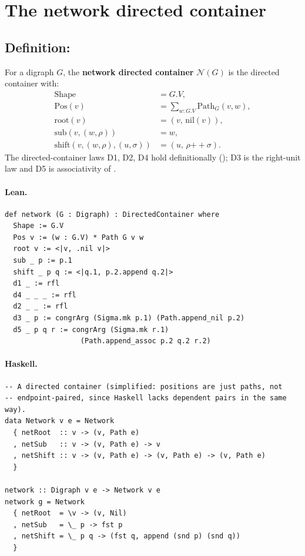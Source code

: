 \documentclass[11pt,a4paper]{article}
\begin{document}
\section{The network directed container}

\subsection{Definition: }

\begin{defn}
For a digraph $G$, the \textbf{network directed container} $\mathcal{N}(G)$ is
the directed container with:
\begin{align*}
  \mathrm{Shape}   &= G.V, \\
  \mathrm{Pos}(v)  &= \textstyle\sum_{w : G.V} \mathrm{Path}_G(v, w), \\
  \mathrm{root}(v) &= (v,\, \mathrm{nil}(v)), \\
  \mathrm{sub}(v, (w, \rho)) &= w, \\
  \mathrm{shift}(v, (w, \rho), (u, \sigma)) &= (u,\, \rho \mathbin{+\!\!+} \sigma).
\end{align*}
The directed-container laws D1, D2, D4 hold definitionally ();
D3 is the right-unit law and D5 is associativity of .
\end{defn}

\paragraph{Lean.}
\begin{lstlisting}[style=lean]
def network (G : Digraph) : DirectedContainer where
  Shape := G.V
  Pos v := (w : G.V) * Path G v w
  root v := <|v, .nil v|>
  sub _ p := p.1
  shift _ p q := <|q.1, p.2.append q.2|>
  d1 _ := rfl
  d4 _ _ _ := rfl
  d2 _ _ := rfl
  d3 _ p := congrArg (Sigma.mk p.1) (Path.append_nil p.2)
  d5 _ p q r := congrArg (Sigma.mk r.1)
                  (Path.append_assoc p.2 q.2 r.2)
\end{lstlisting}

\paragraph{Haskell.}
\begin{lstlisting}[style=haskell]
-- A directed container (simplified: positions are just paths, not
-- endpoint-paired, since Haskell lacks dependent pairs in the same way).
data Network v e = Network
  { netRoot  :: v -> (v, Path e)
  , netSub   :: v -> (v, Path e) -> v
  , netShift :: v -> (v, Path e) -> (v, Path e) -> (v, Path e)
  }

network :: Digraph v e -> Network v e
network g = Network
  { netRoot  = \v -> (v, Nil)
  , netSub   = \_ p -> fst p
  , netShift = \_ p q -> (fst q, append (snd p) (snd q))
  }
\end{lstlisting}
\end{document}
